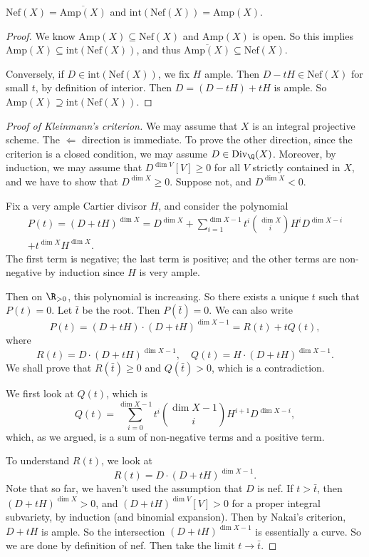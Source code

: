 \documentclass[a4paper]{article}
\newcommand\Div{\mathrm{Div}}
\newcommand\Amp{\mathrm{Amp}}
\newcommand\Nef{\mathrm{Nef}}
\begin{document}
\begin{cor}
  $\Nef(X) = \overline{\Amp(X)}$ and $\mathrm{int}(\Nef(X)) = \Amp(X)$.
\end{cor}

\begin{proof}
  We know $\Amp(X) \subseteq \Nef(X)$ and $\Amp(X)$ is open. So this implies $\Amp(X) \subseteq \mathrm{int}(\Nef(X))$, and thus $\overline{\Amp(X)} \subseteq \Nef(X)$.

  Conversely, if $D \in \mathrm{int}(\Nef(X))$, we fix $H$ ample. Then $D - tH \in \Nef(X)$ for small $t$, by definition of interior. Then $D = (D - tH) + tH$ is ample. So $\Amp(X) \supseteq \mathrm{int}(\Nef(X))$.
\end{proof}

\begin{proof}[Proof of Kleinmann's criterion]
  We may assume that $X$ is an integral projective scheme. The $\Leftarrow$ direction is immediate. To prove the other direction, since the criterion is a closed condition, we may assume $D \in \Div_\Q(X)$. Moreover, by induction, we may assume that $D^{\dim V}[V] \geq 0$ for all $V$ strictly contained in $X$, and we have to show that $D^{\dim X} \geq 0$. Suppose not, and $D^{\dim X} < 0$.

  Fix a very ample Cartier divisor $H$, and consider the polynomial
  \begin{multline*}
    P(t) = (D + tH)^{\dim X} = D^{\dim X} + \sum_{i = 1}^{\dim X - 1} t^i \binom{\dim X}{i} H^i D^{\dim X - i} \\
    + t^{\dim X} H^{\dim X}.
  \end{multline*}
  The first term is negative; the last term is positive; and the other terms are non-negative by induction since $H$ is very ample.

  Then on $\R_{>0}$, this polynomial is increasing. So there exists a unique $t$ such that $P(t) = 0$. Let $\bar{t}$ be the root. Then $P(\bar{t}) = 0$. We can also write
  \[
    P(t) = (D + tH) \cdot (D + tH)^{\dim X - 1} = R(t) + t Q(t),
  \]
  where
  \[
    R(t) = D \cdot (D + tH)^{\dim X - 1},\quad Q(t) = H \cdot (D + tH)^{\dim X - 1}.
  \]
  We shall prove that $R(\bar{t}) \geq 0$ and $Q(\bar{t}) > 0$, which is a contradiction.

  We first look at $Q(t)$, which is
  \[
    Q(t) = \sum_{i = 0}^{\dim X - 1} t^i \binom{\dim X - 1}{i} H^{i + 1} D^{\dim X - i},
  \]
  which, as we argued, is a sum of non-negative terms and a positive term.

  To understand $R(t)$, we look at
  \[
    R(t) = D \cdot (D + tH)^{\dim X - 1}.
  \]
  Note that so far, we haven't used the assumption that $D$ is nef. If $t > \bar{t}$, then $(D + tH)^{\dim X} > 0$, and $(D + tH)^{\dim V}[V] > 0$ for a proper integral subvariety, by induction (and binomial expansion). Then by Nakai's criterion, $D + tH$ is ample. So the intersection $(D + tH)^{\dim X - 1}$ is essentially a curve. So we are done by definition of nef. Then take the limit $t \to \bar{t}$.
\end{proof}
\end{document}
